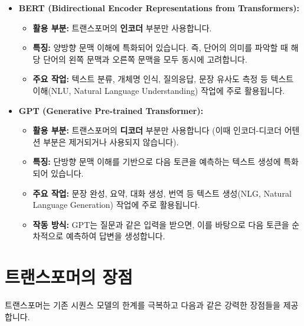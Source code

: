 \documentclass[11pt,a4paper]{article}
\begin{document}
\begin{itemize}
    \item \textbf{BERT (Bidirectional Encoder Representations from Transformers):}
    \begin{itemize}
        \item \textbf{활용 부분:} 트랜스포머의 \textbf{인코더} 부분만 사용합니다.
        \item \textbf{특징:} 양방향 문맥 이해에 특화되어 있습니다. 즉, 단어의 의미를 파악할 때 해당 단어의 왼쪽 문맥과 오른쪽 문맥을 모두 동시에 고려합니다.
        \item \textbf{주요 작업:} 텍스트 분류, 개체명 인식, 질의응답, 문장 유사도 측정 등 텍스트 이해(NLU, Natural Language Understanding) 작업에 주로 활용됩니다.
    \end{itemize}
    \item \textbf{GPT (Generative Pre-trained Transformer):}
    \begin{itemize}
        \item \textbf{활용 부분:} 트랜스포머의 \textbf{디코더} 부분만 사용합니다 (이때 인코더-디코더 어텐션 부분은 제거되거나 사용되지 않습니다).
        \item \textbf{특징:} 단방향 문맥 이해를 기반으로 다음 토큰을 예측하는 텍스트 생성에 특화되어 있습니다.
        \item \textbf{주요 작업:} 문장 완성, 요약, 대화 생성, 번역 등 텍스트 생성(NLG, Natural Language Generation) 작업에 주로 활용됩니다.
    \item \textbf{작동 방식:} GPT는 질문과 같은 입력을 받으면, 이를 바탕으로 다음 토큰을 순차적으로 예측하여 답변을 생성합니다.
    \end{itemize}
\end{itemize}

\newpage
\section{트랜스포머의 장점}
트랜스포머는 기존 시퀀스 모델의 한계를 극복하고 다음과 같은 강력한 장점들을 제공합니다.
\end{document}
